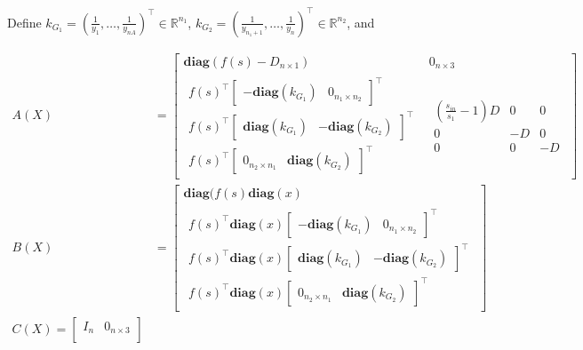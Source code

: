 \documentclass[3p,times]{elsarticle}
\newcommand{\R}{\mathbb{R}}
\newcommand{\diag}{\textbf{diag}}
\begin{document}
Define $k_{G_1} = \left ( \frac{1}{y_1},\dots,\frac{1}{y_{nA}}\right )^\top \in \R^{n_1}$,  $k_{G_2} = \left(\frac{1}{y_{n_1+1}},\dots,\frac{1}{y_{n}}\right )^\top \in \R^{n_2}$, and

\begin{align}
A(X) & = \begin{bmatrix} 
\diag(f(s)- D_{n\times 1} ) & 0_{n \times 3}\\
\begin{matrix} 
f(s)^\top \begin{bmatrix} -\diag(k_{G_1}) & 0_{n_1 \times n_2} \end{bmatrix}^\top  \\
f(s)^\top \begin{bmatrix} \diag(k_{G_1}) & -\diag(k_{G_2}) \end{bmatrix}^\top   \\
f(s)^\top \begin{bmatrix} 0_{n_2 \times n_1} & \diag(k_{G_2}) \end{bmatrix}^\top  \end{matrix} & \begin{matrix} \left(\frac{s_{in}}{s_1}-1\right)D & 0 & 0 \\ 
0 &-D & 0 \\ 
0 & 0 &-D \end{matrix}
\end{bmatrix}  \\
B(X) & = \begin{bmatrix} \diag(f(s)\diag(x)  \\
\begin{matrix}
f(s)^\top \diag(x) \begin{bmatrix} -\diag(k_{G_1}) & 0_{n_1 \times n_2} \end{bmatrix}^\top \\
f(s)^\top \diag(x) \begin{bmatrix} \diag(k_{G_1}) & -\diag(k_{G_2}) \end{bmatrix}^\top  \\
f(s)^\top \diag(x) \begin{bmatrix} 0_{n_2 \times n_1} & \diag(k_{G_2}) \end{bmatrix}^\top  
\end{matrix}
\end{bmatrix} \\
C(X) = \begin{bmatrix}
I_n & 0_{n\times 3} \\
\end{bmatrix}
\end{align}
\end{document}
